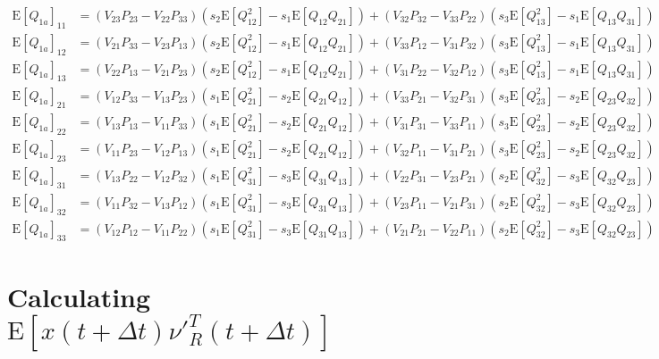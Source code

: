 \documentclass[10pt]{article}
\newcommand{\expect}[1]{\ensuremath{\mathrm{E}\left[ #1 \right]}}
\begin{document}
\begin{align} \label{eqn:Q1a}
	\expect{Q_{1a}}_{11} &= (V_{23}P_{23}-V_{22}P_{33})(s_2\expect{Q_{12}^2}-s_1\expect{Q_{12}Q_{21}}) + (V_{32}P_{32}-V_{33}P_{22})(s_3\expect{Q_{13}^2}-s_1\expect{Q_{13}Q_{31}}) \nonumber \\
	\expect{Q_{1a}}_{12} &= (V_{21}P_{33}-V_{23}P_{13})(s_2\expect{Q_{12}^2}-s_1\expect{Q_{12}Q_{21}}) + 
	(V_{33}P_{12}-V_{31}P_{32})(s_3\expect{Q_{13}^2}-s_1\expect{Q_{13}Q_{31}}) \nonumber \\
	\expect{Q_{1a}}_{13} &= (V_{22}P_{13}-V_{21}P_{23})(s_2\expect{Q_{12}^2}-s_1\expect{Q_{12}Q_{21}}) + (V_{31}P_{22}-V_{32}P_{12})(s_3\expect{Q_{13}^2}-s_1\expect{Q_{13}Q_{31}}) \nonumber \\
	\expect{Q_{1a}}_{21} &= (V_{12}P_{33}-V_{13}P_{23})(s_1\expect{Q_{21}^2}-s_2\expect{Q_{21}Q_{12}}) + (V_{33}P_{21}-V_{32}P_{31})(s_3\expect{Q_{23}^2}-s_2\expect{Q_{23}Q_{32}}) \nonumber \\
	\expect{Q_{1a}}_{22} &= (V_{13}P_{13}-V_{11}P_{33})(s_1\expect{Q_{21}^2}-s_2\expect{Q_{21}Q_{12}}) + (V_{31}P_{31}-V_{33}P_{11})(s_3\expect{Q_{23}^2}-s_2\expect{Q_{23}Q_{32}}) \nonumber \\
	\expect{Q_{1a}}_{23} &= (V_{11}P_{23}-V_{12}P_{13})(s_1\expect{Q_{21}^2}-s_2\expect{Q_{21}Q_{12}}) + (V_{32}P_{11}-V_{31}P_{21})(s_3\expect{Q_{23}^2}-s_2\expect{Q_{23}Q_{32}}) \nonumber \\
	\expect{Q_{1a}}_{31} &= (V_{13}P_{22}-V_{12}P_{32})(s_1\expect{Q_{31}^2}-s_3\expect{Q_{31}Q_{13}}) + (V_{22}P_{31}-V_{23}P_{21})(s_2\expect{Q_{32}^2}-s_3\expect{Q_{32}Q_{23}}) \nonumber \\
	\expect{Q_{1a}}_{32} &= (V_{11}P_{32}-V_{13}P_{12})(s_1\expect{Q_{31}^2}-s_3\expect{Q_{31}Q_{13}}) + (V_{23}P_{11}-V_{21}P_{31})(s_2\expect{Q_{32}^2}-s_3\expect{Q_{32}Q_{23}}) \nonumber \\
	\expect{Q_{1a}}_{33} &= (V_{12}P_{12}-V_{11}P_{22})(s_1\expect{Q_{31}^2}-s_3\expect{Q_{31}Q_{13}}) + (V_{21}P_{21}-V_{22}P_{11})(s_2\expect{Q_{32}^2}-s_3\expect{Q_{32}Q_{23}})
\end{align}

\section{Calculating $\expect{x(t+\Delta t)\nu'^T_R(t+\Delta t)}$}
\end{document}
